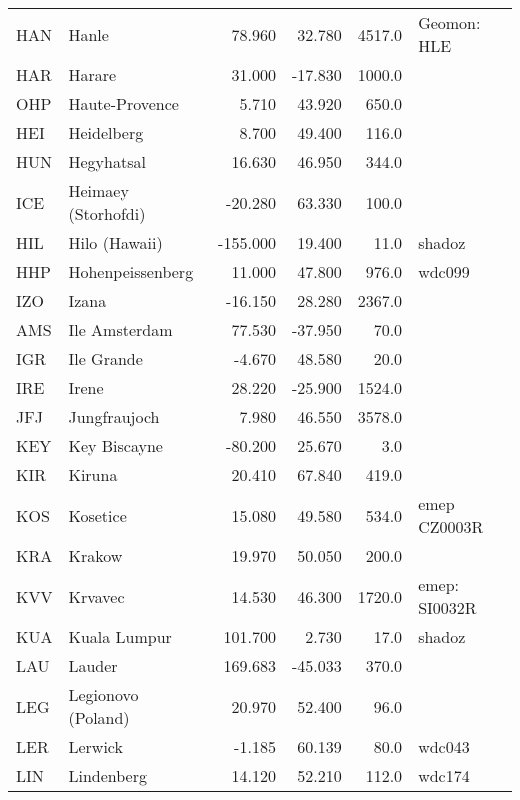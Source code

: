 \begin{table*}[!th]
\begin{tabular}{llrrrl}
HAN & Hanle                       &     78.960 &  32.780 &  4517.0 & Geomon: HLE\\
HAR & Harare                      &     31.000 & -17.830 &  1000.0 &\\
OHP & Haute-Provence              &      5.710 &  43.920 &   650.0 &\\
HEI & Heidelberg                  &      8.700 &  49.400 &   116.0 &\\
HUN & Hegyhatsal                  &     16.630 &  46.950 &   344.0 &\\
ICE & Heimaey (Storhofdi)         &    -20.280 &  63.330 &   100.0 &\\
HIL & Hilo (Hawaii)               &   -155.000 &  19.400 &    11.0 & shadoz\\
HHP & Hohenpeissenberg            &     11.000 &  47.800 &   976.0 & wdc099\\
IZO & Izana                       &    -16.150 &  28.280 &  2367.0 &\\
AMS & Ile Amsterdam               &     77.530 & -37.950 &    70.0 &\\
IGR & Ile Grande                  &     -4.670 &  48.580 &    20.0 &\\
IRE & Irene                       &     28.220 & -25.900 &  1524.0 &\\
JFJ & Jungfraujoch                &      7.980 &  46.550 &  3578.0 &\\
KEY & Key Biscayne                &    -80.200 &  25.670 &     3.0 &\\
KIR & Kiruna                      &     20.410 &  67.840 &   419.0 &\\
KOS & Kosetice                    &     15.080 &  49.580 &   534.0 & emep CZ0003R\\
KRA & Krakow                      &     19.970 &  50.050 &   200.0 &\\
KVV & Krvavec                     &     14.530 &  46.300 &  1720.0 & emep: SI0032R\\
KUA & Kuala Lumpur                &    101.700 &   2.730 &    17.0 & shadoz\\
LAU & Lauder                      &    169.683 & -45.033 &   370.0 &\\
LEG & Legionovo (Poland)          &     20.970 &  52.400 &    96.0 &\\
LER & Lerwick                     &     -1.185 &  60.139 &    80.0 & wdc043\\
LIN & Lindenberg                  &     14.120 &  52.210 &   112.0 & wdc174\\

\end{tabular}
\end{table*}
